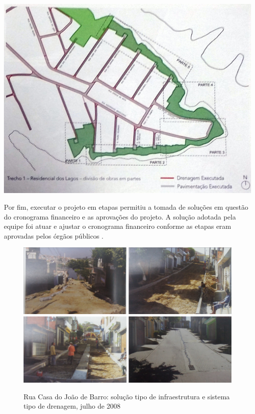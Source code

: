 	\hfill
	\begin{minipage}[b]{.4\linewidth}
		\includegraphics[width=\textwidth]{img/barda_trecho_reslagos}
		\label{fig:barda_trecho_reslagos}
	\end{minipage}
	
	Por fim, executar o projeto em etapas permitiu a tomada de soluções em questão do cronograma financeiro e as aprovações do projeto. A solução adotada pela equipe foi atuar e ajustar o cronograma financeiro conforme as etapas eram aprovadas pelos órgãos públicos \cite{Barda2012}.
	
	\begin{figure}[htb]
		\centering
		\caption[Soluções adotadas na rua Casa do João de Barro]{Rua Casa do João de Barro: solução tipo de infraestrutura e sistema tipo de drenagem, julho de 2008}
		\includegraphics[width=\linewidth]{img/barda_solucoes}
		\label{fig:solucoes}
	\end{figure}
	
